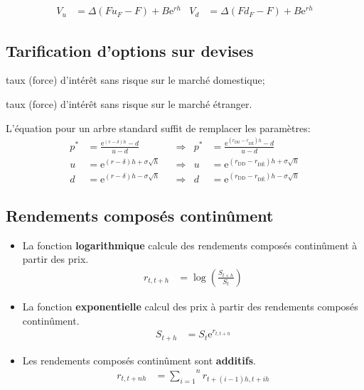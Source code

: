 \documentclass[10pt, french]{article}
\begin{document}
\begin{multicols*}{2}
\begin{align*}
	V_{u}
		&=	\Delta	(F u_{F} - F) + B \textrm{e}^{rh}	&
	V_{d}
		&=	\Delta	(F d_{F} - F) + B \textrm{e}^{rh}
\end{align*}

\subsection*{Tarification d'options sur devises}
\begin{distributions}[Notation]
\begin{description}[leftmargin = *]
	\item[$r_{\text{DD}}$]	taux (force) d'intérêt sans risque sur le marché domestique;
	\item[$r_{\text{DÉ}}$]	taux (force) d'intérêt sans risque sur le marché étranger.
\end{description}
\end{distributions}

L'équation pour un arbre standard suffit de remplacer les paramètres:
\begin{align*}
	p^{*}	&=	\frac{\textrm{e}^{(r - \delta)h} - d}{u - d}	&
	&\Rightarrow	&
	p^{*}	&=	\frac{\textrm{e}^{(r_{\text{DD}} - r_{\text{DÉ}})h} - d}{u - d}	\\
	u	&=	\textrm{e}^{(r - \delta)h + \sigma \sqrt{h}}	&
	&\Rightarrow	&
	u	&=	\textrm{e}^{(r_{\text{DD}} - r_{\text{DÉ}})h + \sigma \sqrt{h}}	\\
	d	&=	\textrm{e}^{(r - \delta)h - \sigma \sqrt{h}}	&
	&\Rightarrow	&
	d	&=	\textrm{e}^{(r_{\text{DD}} - r_{\text{DÉ}})h - \sigma \sqrt{h}}	
\end{align*}
	
	
\subsection*{Rendements composés continûment}
\begin{itemize}
	\item	La fonction \textbf{logarithmique} calcule des rendements composés continûment à partir des prix.
		\begin{align*}
		r_{t, t + h} &= \log\left(\frac{S_{t + h}}{S_{t}}\right)
		\end{align*}
	\item	La fonction \textbf{exponentielle} calcul des prix à partir des rendements composés continûment.
		\begin{align*}
		S_{t + h}	&=	S_{t}\textrm{e}^{r_{t, t + h}}
		\end{align*}
	\item	Les rendements composés continûment sont \textbf{additifs}.
		\begin{align*}
		r_{t, t + nh}	&=	\overset{n}{\underset{i = 1}{\sum}} r_{t + (i - 1)h, t + ih}
		\end{align*}
\end{itemize}	


\end{multicols*}
\end{document}
